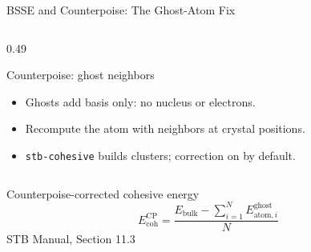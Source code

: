 \documentclass[8pt]{beamer}
\begin{document}
\begin{frame}{BSSE and Counterpoise: The Ghost-Atom Fix}
\begin{columns}[T]
\begin{column}{0.49\textwidth}
\begin{block}{Counterpoise: ghost neighbors}
				\begin{itemize}\footnotesize
					\setlength{\itemsep}{1pt}
					\item Ghosts add basis only: no nucleus or electrons.
					\item Recompute the atom with neighbors at crystal positions.
					\item \texttt{stb-cohesive} builds clusters; correction on by default.
				\end{itemize}
			\end{block}
		\end{column}
	\end{columns}
	\vspace{0.05cm}
	\begin{block}{Counterpoise-corrected cohesive energy}
		\centering
		\[
			E_{\mathrm{coh}}^{\mathrm{CP}}=
			\frac{E_{\mathrm{bulk}}-\sum_{i=1}^{N}E_{\mathrm{atom},i}^{\mathrm{ghost}}}{N}
		\]
		{\scriptsize STB Manual, Section 11.3}
	\end{block}
\end{frame}
\end{document}
